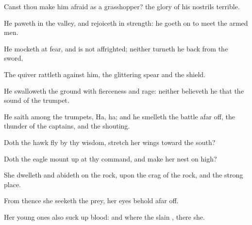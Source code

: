 {Canst thou make him
afraid as a
grasshopper? the
glory of his
nostrils
{}
terrible.

He
paweth in the
valley, and
rejoiceth in
{}
strength: he goeth
on to
meet the armed
men.

He
mocketh at
fear, and is not
affrighted; neither turneth he
back
from the
sword.

The
quiver
rattleth against him, the
glittering
spear and the
shield.

He
swalloweth the
ground with
fierceness and
rage: neither
believeth he that
{} the
sound of the
trumpet.

He
saith
among the
trumpets,
Ha,
ha; and he
smelleth the
battle afar
off, the
thunder of the
captains, and the
shouting.


\par }{\PP {}Doth the
hawk
fly by thy
wisdom,
{}
stretch her
wings toward the
south?

Doth the
eagle mount
up at thy
command, and
make her
nest on
high?

She
dwelleth and
abideth on the
rock, upon the
crag of the
rock, and the strong
place.

From thence she
seeketh the
prey,
{} her
eyes
behold afar
off.

Her young
ones also suck
up
blood: and where the
slain
{}, there
{}
she.




\par }

